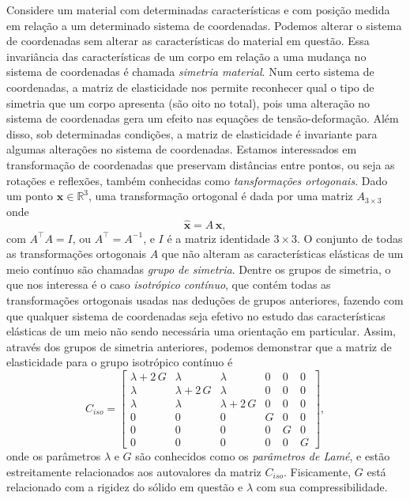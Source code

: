 Considere um material com determinadas caracter\'isticas e com posi\c{c}\~ao medida em rela\c{c}\~ao a um determinado sistema de coordenadas. Podemos alterar o sistema de coordenadas sem alterar as caracter\'isticas do material em quest\~ao. Essa invari\^ancia das caracter\'isticas de um corpo em rela\c{c}\~ao a uma mudan\c{c}a no sistema de coordenadas \'e chamada \textit{simetria material}. Num certo sistema de coordenadas, a matriz de elasticidade nos permite reconhecer qual o tipo de simetria que um corpo apresenta (s\~ao oito no total), pois uma altera\c{c}\~ao no sistema de coordenadas gera um efeito nas equa\c{c}\~oes de tens\~ao-deforma\c{c}\~ao.  Além disso, sob determinadas condi\c{c}\~oes, a matriz de elasticidade \'e invariante para algumas altera\c{c}\~oes no sistema de coordenadas.
Estamos interessados em transforma\c{c}\~ao de coordenadas que preservam dist\^ancias entre pontos, ou seja as rota\c{c}\~oes e reflex\~oes, tamb\'em conhecidas como \textit{tansforma\c{c}\~oes ortogonais}. Dado um ponto $\mathbf{x}\in\mathbb{R}^3$, uma transforma\c{c}\~ao ortogonal \'e dada por uma matriz $A_{3\times 3}$ onde 
\begin{equation*}
\mathbf{\hat{x}}=A\,\mathbf{x},
\end{equation*} 
com $A^\top A=I$, ou $A^\top=A^{-1}$, e $I$ \'e a matriz identidade $3\times 3$.
O conjunto de todas as transforma\c{c}\~oes ortogonais $A$ que n\~ao alteram as caracter\'isticas el\'asticas de um meio cont\'inuo s\~ao chamadas \textit{grupo de simetria}. Dentre os grupos de simetria, o que nos interessa \'e o caso \textit{isotr\'opico cont\'inuo}, que cont\'em todas as transforma\c{c}\~oes ortogonais usadas nas deduções de grupos anteriores, fazendo com que qualquer sistema de coordenadas seja efetivo no estudo das caracter\'isticas el\'asticas de um meio n\~ao sendo necess\'aria uma orienta\c{c}\~ao em particular. Assim, atrav\'es dos grupos de simetria anteriores, podemos demonstrar que a matriz de elasticidade para o grupo isotr\'opico cont\'inuo \'e
\begin{equation}
C_{iso}=
\begin{bmatrix}
\lambda +2\,G & \lambda & \lambda &0&0&0\\
\lambda&\lambda+2\,G&\lambda&0&0&0\\
\lambda&\lambda&\lambda+2\,G&0&0&0\\
0&0&0&G&0&0\\
0&0&0&0&G&0\\
0&0&0&0&0&G
\end{bmatrix},
\end{equation} 
onde os par\^ametros $\lambda$ e $G$ s\~ao conhecidos como os \textit{par\^ametros de Lam\'e}, e est\~ao estreitamente relacionados aos autovalores da matriz $C_{iso}$. Fisicamente, $G$ est\'a relacionado com a rigidez do s\'olido em quest\~ao e $\lambda$ com sua compressibilidade.

